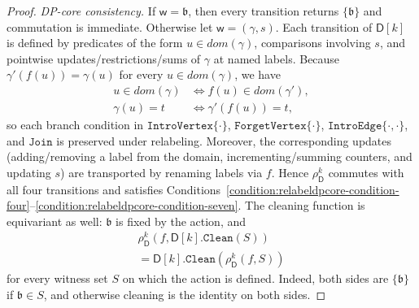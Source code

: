 \documentclass[11pt,a4paper]{article}
\newcommand{\treewidthvalue}{k}
\newcommand{\introvertextype}[1]{\mathtt{IntroVertex}\{#1\}}
\newcommand{\forgetvertextype}[1]{\mathtt{ForgetVertex}\{#1\}}
\newcommand{\introedgegeneric}[2]{\mathtt{IntroEdge}\{#1,#2\}}
\newcommand{\joingenericcore}{\mathtt{Join}}
\newcommand{\cleaningfunctioncore}{\mathtt{Clean}}
\newcommand{\vertexone}{u}
\newcommand{\awitness}{\mathsf{w}}
\newcommand{\dpcore}{\mathsf{D}}
\newcommand{\witnessset}{S}
\newcommand{\domain}{dom}
\newcommand{\cliquemap}{\gamma}
\newcommand{\cliquesize}{s}
\newcommand{\cliquefound}{\mathfrak{b}}
\newcommand{\relabelingfunction}{f}
\newcommand{\action}{\rho}
\begin{document}
{\begin{proof}
		\smallskip\noindent
		\emph{DP-core consistency.}
		If $\awitness=\cliquefound$, then every transition returns $\{\cliquefound\}$ and commutation is immediate.
		Otherwise let $\awitness=(\cliquemap,\cliquesize)$.
		Each transition of $\dpcore[\treewidthvalue]$ is defined by predicates of the form $\vertexone\in \domain(\cliquemap)$, comparisons involving $\cliquesize$, and pointwise updates/restrictions/sums of $\cliquemap$ at named labels.
		Because $\cliquemap'(\relabelingfunction(u))=\cliquemap(u)$ for every $u\in \domain(\cliquemap)$, we have
		\begin{align*}
		\vertexone\in \domain(\cliquemap) &\iff \relabelingfunction(\vertexone)\in \domain(\cliquemap'),\\
		\cliquemap(\vertexone)=t &\iff \cliquemap'(\relabelingfunction(\vertexone))=t,
		\end{align*}
		so each branch condition in $\introvertextype{\cdot}$, $\forgetvertextype{\cdot}$, $\introedgegeneric{\cdot}{\cdot}$, and $\joingenericcore$ is preserved under relabeling.
			Moreover, the corresponding updates (adding/removing a label from the domain, incrementing/summing counters, and updating $\cliquesize$) are transported by renaming labels via $\relabelingfunction$.
			Hence $\action_{\dpcore}^{\treewidthvalue}$ commutes with all four transitions and satisfies Conditions~\ref{condition:relabeldpcore-condition-four}--\ref{condition:relabeldpcore-condition-seven}.
				The cleaning function is equivariant as well: $\cliquefound$ is fixed by the action, and
				\begin{multline*}
				\action_{\dpcore}^{\treewidthvalue}(\relabelingfunction,
				\dpcore[\treewidthvalue].\cleaningfunctioncore(\witnessset))\\
				=
				\dpcore[\treewidthvalue].\cleaningfunctioncore(
				\action_{\dpcore}^{\treewidthvalue}(\relabelingfunction,\witnessset))
				\end{multline*}
				for every witness set $\witnessset$ on which the action is defined.
			Indeed, both sides are $\{\cliquefound\}$ if $\cliquefound\in\witnessset$, and otherwise cleaning is the identity on both sides.
			\end{proof}

}
\end{document}
